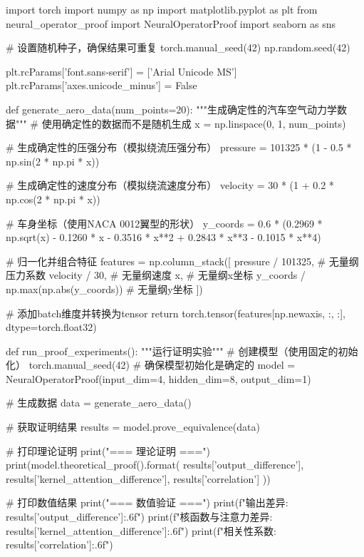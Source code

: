 \documentclass{MMCStyle}
\begin{document}
 \begin{python}
import torch
import numpy as np
import matplotlib.pyplot as plt
from neural_operator_proof import NeuralOperatorProof
import seaborn as sns

# 设置随机种子，确保结果可重复
torch.manual_seed(42)
np.random.seed(42)

plt.rcParams['font.sans-serif'] = ['Arial Unicode MS']
plt.rcParams['axes.unicode_minus'] = False

def generate_aero_data(num_points=20):
    """生成确定性的汽车空气动力学数据"""
    # 使用确定性的数据而不是随机生成
    x = np.linspace(0, 1, num_points)
    
    # 生成确定性的压强分布（模拟绕流压强分布）
    pressure = 101325 * (1 - 0.5 * np.sin(2 * np.pi * x))
    
    # 生成确定性的速度分布（模拟绕流速度分布）
    velocity = 30 * (1 + 0.2 * np.cos(2 * np.pi * x))
    
    # 车身坐标（使用NACA 0012翼型的形状）
    y_coords = 0.6 * (0.2969 * np.sqrt(x) - 0.1260 * x - 
                      0.3516 * x**2 + 0.2843 * x**3 - 0.1015 * x**4)
    
    # 归一化并组合特征
    features = np.column_stack([
        pressure / 101325,  # 无量纲压力系数
        velocity / 30,      # 无量纲速度
        x,                  # 无量纲x坐标
        y_coords / np.max(np.abs(y_coords))  # 无量纲y坐标
    ])
    
    # 添加batch维度并转换为tensor
    return torch.tensor(features[np.newaxis, :, :], dtype=torch.float32)

def run_proof_experiments():
    """运行证明实验"""
    # 创建模型（使用固定的初始化）
    torch.manual_seed(42)  # 确保模型初始化是确定的
    model = NeuralOperatorProof(input_dim=4, hidden_dim=8, output_dim=1)
    
    # 生成数据
    data = generate_aero_data()
    
    # 获取证明结果
    results = model.prove_equivalence(data)
    
    # 打印理论证明
    print("\n=== 理论证明 ===")
    print(model.theoretical_proof().format(
        results['output_difference'],
        results['kernel_attention_difference'],
        results['correlation']
    ))
    
    # 打印数值结果
    print("\n=== 数值验证 ===")
    print(f"输出差异: {results['output_difference']:.6f}")
    print(f"核函数与注意力差异: {results['kernel_attention_difference']:.6f}")
    print(f"相关性系数: {results['correlation']:.6f}")
    

\end{python}
\end{document}
